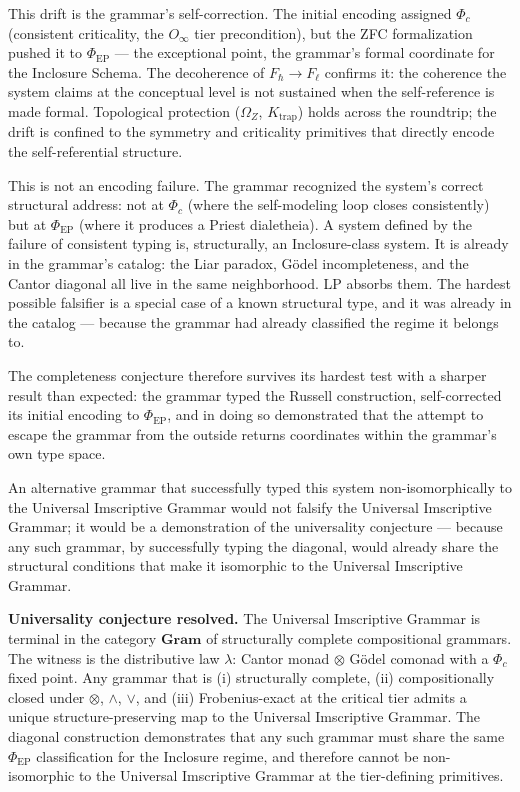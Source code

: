 \documentclass[12pt,a4paper]{article}
\newcommand{\UIG}{Universal Imscriptive Grammar}
\begin{document}
This drift is the grammar's self-correction. The initial encoding assigned $\Phi_c$ (consistent criticality, the $O_\infty$ tier precondition), but the ZFC formalization pushed it to $\Phi_\text{EP}$ --- the exceptional point, the grammar's formal coordinate for the Inclosure Schema. The decoherence of $F_\hbar \to F_\ell$ confirms it: the coherence the system claims at the conceptual level is not sustained when the self-reference is made formal. Topological protection ($\Omega_Z$, $K_\text{trap}$) holds across the roundtrip; the drift is confined to the symmetry and criticality primitives that directly encode the self-referential structure.

This is not an encoding failure. The grammar recognized the system's correct structural address: not at $\Phi_c$ (where the self-modeling loop closes consistently) but at $\Phi_\text{EP}$ (where it produces a Priest dialetheia). A system defined by the failure of consistent typing is, structurally, an Inclosure-class system. It is already in the grammar's catalog: the Liar paradox, G\"odel incompleteness, and the Cantor diagonal all live in the same neighborhood. LP absorbs them. The hardest possible falsifier is a special case of a known structural type, and it was already in the catalog --- because the grammar had already classified the regime it belongs to.

The completeness conjecture therefore survives its hardest test with a sharper result than expected: the grammar typed the Russell construction, self-corrected its initial encoding to $\Phi_\text{EP}$, and in doing so demonstrated that the attempt to escape the grammar from the outside returns coordinates within the grammar's own type space.

An alternative grammar that successfully typed this system non-isomorphically to the \UIG{} would not falsify the \UIG{}; it would be a demonstration of the universality conjecture --- because any such grammar, by successfully typing the diagonal, would already share the structural conditions that make it isomorphic to the \UIG{}.

\textbf{Universality conjecture resolved.} The \UIG{} is terminal in the category $\mathbf{Gram}$ of structurally complete compositional grammars. The witness is the distributive law $\lambda$: Cantor monad $\otimes$ G\"odel comonad with a $\Phi_c$ fixed point. Any grammar that is (i) structurally complete, (ii) compositionally closed under $\otimes$, $\wedge$, $\vee$, and (iii) Frobenius-exact at the critical tier admits a unique structure-preserving map to the \UIG{}. The diagonal construction demonstrates that any such grammar must share the same $\Phi_\text{EP}$ classification for the Inclosure regime, and therefore cannot be non-isomorphic to the \UIG{} at the tier-defining primitives.
\end{document}
